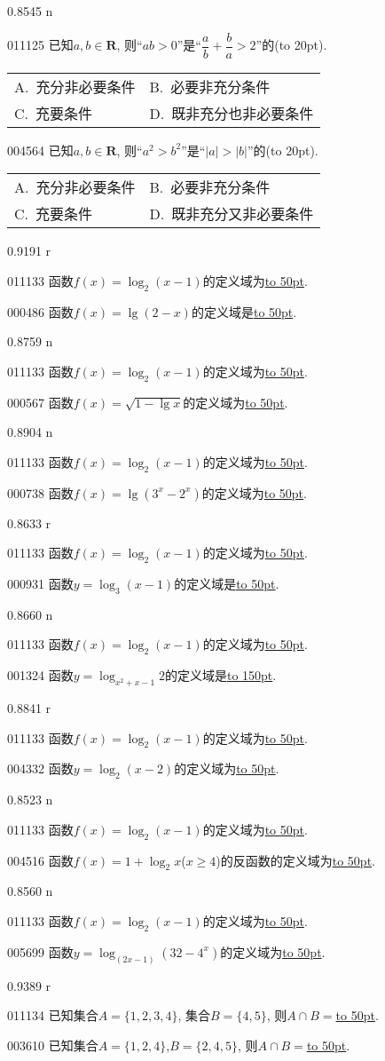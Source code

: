 \documentclass[10pt,a4paper]{article}
\newcommand{\blank}[1]{\underline{\hbox to #1pt{}}}
\newcommand{\bracket}[1]{(\hbox to #1pt{})}
\newcommand{\twoch}[4]{\par\begin{tabular}{p{.46\textwidth}p{.46\textwidth}}
A.~#1& B.~#2\\
C.~#3& D.~#4
\end{tabular}}
\begin{document}
0.8545 n

011125	已知$a,b\in \mathbf{R}$, 则``$ab>0$''是``$\dfrac ab+\dfrac ba>2$''的\bracket{20}.
\twoch{充分非必要条件}{必要非充分条件}{充要条件}{既非充分也非必要条件}

004564	已知$a,b\in\mathbf{R}$, 则``$a^2>b^2$''是``$|a|>|b|$''的\bracket{20}.
\twoch{充分非必要条件}{必要非充分条件}{充要条件}{既非充分又非必要条件}

0.9191 r

011133	函数$f(x)=\log_2(x-1)$的定义域为\blank{50}.

000486	函数$f(x)=\lg(2-x)$的定义域是\blank{50}.

0.8759 n

011133	函数$f(x)=\log_2(x-1)$的定义域为\blank{50}.

000567	函数$f(x)=\sqrt{1-\lg x}$的定义域为\blank{50}.

0.8904 n

011133	函数$f(x)=\log_2(x-1)$的定义域为\blank{50}.

000738	函数$f(x)=\lg (3^x-2^x)$的定义域为\blank{50}.

0.8633 r

011133	函数$f(x)=\log_2(x-1)$的定义域为\blank{50}.

000931	函数$y=\log_3 (x-1)$的定义域是\blank{50}.

0.8660 n

011133	函数$f(x)=\log_2(x-1)$的定义域为\blank{50}.

001324	函数$y=\log_{x^2+x-1} 2$的定义域是\blank{150}.

0.8841 r

011133	函数$f(x)=\log_2(x-1)$的定义域为\blank{50}.

004332	函数$y=\log_2(x-2)$的定义域为\blank{50}.

0.8523 n

011133	函数$f(x)=\log_2(x-1)$的定义域为\blank{50}.

004516	函数$f(x)=1+\log_2x$($x\ge 4$)的反函数的定义域为\blank{50}.

0.8560 n 

011133	函数$f(x)=\log_2(x-1)$的定义域为\blank{50}.

005699	函数$y=\log_{(2x-1)}(32-4^x)$的定义域为\blank{50}.

0.9389 r

011134	已知集合$A=\{1,2,3,4\}$, 集合$B=\{4,5\}$, 则$A\cap B=$\blank{50}.

003610	已知集合$A=\{1,2,4\}$,$B=\{2,4,5\}$, 则$A\cap B=$\blank{50}.
\end{document}

